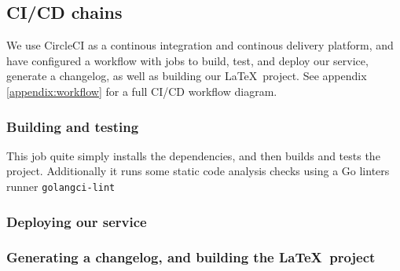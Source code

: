 \subsection{CI/CD chains}

We use CircleCI as a continous integration and continous delivery platform, and have configured a workflow \cite{workflow:circleci} with jobs to build, test, and deploy our service, generate a changelog, as well as building our \LaTeX\ project. See appendix \ref{appendix:workflow} for a full CI/CD workflow diagram.



\subsubsection{Building and testing}

This job quite simply installs the dependencies, and then builds and tests the project. Additionally it runs some static code analysis checks using a Go linters runner \texttt{golangci-lint}


\subsubsection{Deploying our service}




\subsubsection{Generating a changelog, and building the \LaTeX\ project}


